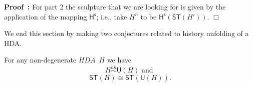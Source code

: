 \documentclass[submission,copyright,creativecommons]{eptcs}
\newenvironment{proof}[1][\!\!\,]{\vspace{1ex}\noindent\textbf{Proof #1: }}{\hfill$\Box$\vspace{2ex}}
\newcommand{\cp}[1]{}
\newcommand{\notforsubmission}[1]{}
\newcommand\start[2]{\ensuremath{\{#1\}#2}}
\newcommand\terminate[2]{\ensuremath{\langle #1\rangle #2}}
\newcommand\hHDML{\ensuremath{\mathit{hHDML}}}
\newcommand\HDA{\ensuremath{\mathit{HDA}}}
\newcommand\HDAs{\ensuremath{\mathit{HDAs}}}
\newcommand\isomorphic{\ensuremath{\cong}}
\newcommand\stintoh{\ensuremath{\mathsf{H}}}
\newcommand\stintosculpture{\ensuremath{\stintoh^{\mathsf{s}}}}
\newcommand\hintost{\ensuremath{\mathsf{ST}}}
\newcommand\unfolding{\ensuremath{\mathsf{U}}}
\newcommand\sculpture[2]{\ensuremath{#1^{#2}}}
\newcommand\hhequiv{\ensuremath{\stackrel{hh}{\sim}}}
\begin{document}
\begin{proof}
For part 2 the sculpture that we are looking for is given by the application of the mapping \stintosculpture; i.e., take $\sculpture{H}{n}$ to be $\stintosculpture(\hintost(H'))$.
\end{proof}

We end this section by making two conjectures related to history unfolding of a HDA. 

For any non-degenerate \HDA\ $H$ we have
\[
H \hhequiv \unfolding(H) \mbox{\ and\ }
\]
\[
\hintost(H)\isomorphic \hintost(\unfolding(H)).
\]




\notforsubmission{
\cp{
\section{History-aware Higher Dimensional Modal Logic}
}

\cp{
The termination predicate of \cite[def.9.6]{GlabbeekG01refinement} can be defined for ST-structures also, and for \HDAs\ using the set of final states/cells. The \hHDML\ can also express if these are \textit{maximal} using $\neg\start{}{\top}$ or $\neg\terminate{}{\top}$ to say that no more events can be started or terminated in a cell/ST-configuration. 
}


\cp{!!!Maybe leave this for a journal version.}

\cp{

}}
\end{document}
